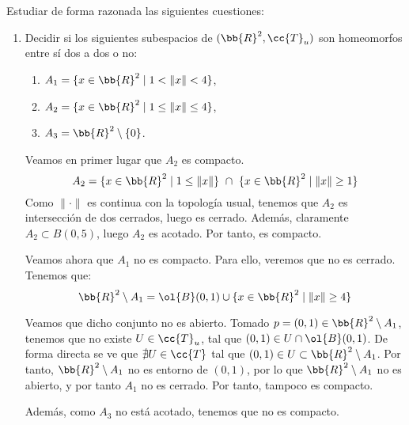 \documentclass[12pt]{article}
\newcommand{\T}[0]{\cc{T}}
\begin{document}
    \begin{ejercicio}[3 puntos] Estudiar de forma razonada las siguientes cuestiones:
        \begin{enumerate}
            \item Decidir si los siguientes subespacios de $(\bb{R}^2,\T_u)$ son homeomorfos entre sí dos a dos o no:
            \begin{enumerate}
                \item $A_1=\{x\in \bb{R}^2\mid 1<\|x\|<4\}$,
                \item $A_2=\{x\in \bb{R}^2\mid 1\leq \|x\|\leq 4\}$,
                \item $A_3=\bb{R}^2\setminus \{0\}$.
            \end{enumerate}

            Veamos en primer lugar que $A_2$ es compacto. $$A_2=\{x\in \bb{R}^2\mid 1\leq \|x\|\}~\cap~\{x\in \bb{R}^2\mid \|x\|\geq 1\}$$
            Como $\|\cdot\|$ es continua con la topología usual, tenemos que $A_2$ es intersección de dos cerrados, luego es cerrado.
            Además, claramente $A_2\subset B(0, 5)$, luego $A_2$ es acotado. Por tanto, es compacto.

            Veamos ahora que $A_1$ no es compacto. Para ello, veremos que no es cerrado. Tenemos que:
            \begin{equation*}
                \bb{R}^2\setminus A_1 = \ol{B}(0,1) \cup \{x\in \bb{R}^2\mid \|x\|\geq 4\} 
            \end{equation*}

            Veamos que dicho conjunto no es abierto. Tomado $p=(0,1)\in \bb{R}^2\setminus A_1$,
            tenemos que no existe $U\in \T_u$, tal que $(0,1)\in U\cap \ol{B}(0,1)$.
            De forma directa se ve que $\nexists U\in \T$ tal que $(0,1)\in U\subset \bb{R}^2\setminus A_1$. Por tanto, $\bb{R}^2\setminus A_1$ no es entorno
            de $(0,1)$, por lo que $\bb{R}^2\setminus A_1$ no es abierto, y por tanto $A_1$ no es cerrado. Por tanto, tampoco es compacto.

            Además, como $A_3$ no está acotado, tenemos que no es compacto.\\


\end{enumerate}
\end{ejercicio}
\end{document}
